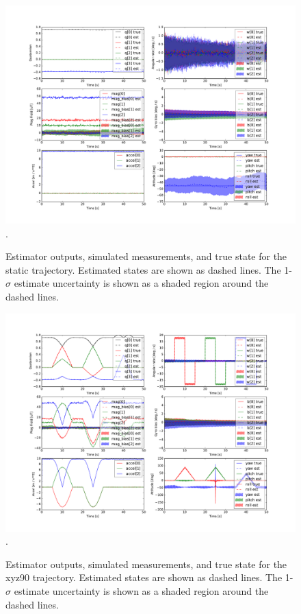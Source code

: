 \documentclass[conference]{IEEEtran}
\begin{document}
\begin{figure}[!t]
  \centering
  \includegraphics[width=8in]{figures/est_result_sim_static.pdf}
  \DeclareGraphicsExtensions.
  \caption{Estimator outputs, simulated measurements, and true state for the static trajectory. Estimated states are shown as dashed lines. The 1-$\sigma$ estimate uncertainty is shown as a shaded region around the dashed lines.}
  \label{fig:est_result_sim_static}
\end{figure}

\begin{figure}[!t]
  \centering
  \includegraphics[width=8in]{figures/est_result_sim_xyz90.pdf}
  \DeclareGraphicsExtensions.
  \caption{Estimator outputs, simulated measurements, and true state for the xyz90 trajectory. Estimated states are shown as dashed lines. The 1-$\sigma$ estimate uncertainty is shown as a shaded region around the dashed lines.}
  \label{fig:est_result_sim_xyz90}
\end{figure}
\end{document}
